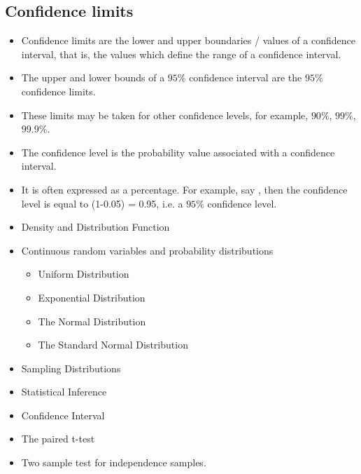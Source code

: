 \documentclass[]{report}
\begin{document}
{
\subsection{Confidence limits}

\begin{itemize}

\item Confidence limits are the lower and upper boundaries / values of a confidence interval, that is, the values which define the range of a confidence interval.

\item The upper and lower bounds of a $95\%$ confidence interval are the $95\%$ confidence limits. 

\item These limits may be taken for other confidence levels, for example, $90\%$, $99\%$, $99.9\%$.




\item The confidence level is the probability value  associated with a confidence interval. 

\item It is often expressed as a percentage. For example, say , then the confidence level is equal to (1-0.05) = 0.95, i.e. a $95\%$ confidence level.

\end{itemize}
}



\begin{itemize}
\item Density and Distribution Function
\item Continuous random variables and probability distributions
\begin{itemize}
\item Uniform Distribution
\item Exponential Distribution
\item The Normal Distribution
\item The Standard Normal Distribution
\end{itemize}
\item Sampling Distributions
\item Statistical Inference
\item Confidence Interval
\item The paired t-test
\item Two sample test for independence samples.
\end{itemize}
\end{document}
